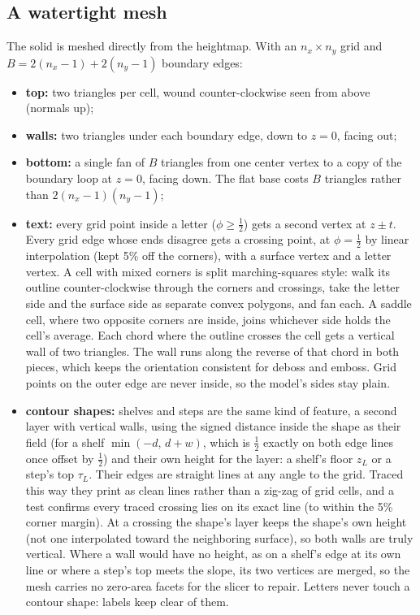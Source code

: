\documentclass[11pt,letterpaper]{article}
\begin{document}
\subsection{A watertight mesh}
\label{sec:mesh}

The solid is meshed directly from the heightmap. With an $n_x \times n_y$ grid and $B = 2(n_x - 1) + 2(n_y - 1)$ boundary edges:
\begin{itemize}
\setlength\itemsep{1pt}
\item \textbf{top:} two triangles per cell, wound counter-clockwise seen from above (normals up);
\item \textbf{walls:} two triangles under each boundary edge, down to $z = 0$, facing out;
\item \textbf{bottom:} a single fan of $B$ triangles from one center vertex to a copy of the boundary loop at $z = 0$, facing down. The flat base costs $B$ triangles rather than $2(n_x - 1)(n_y - 1)$;
\item \textbf{text:} every grid point inside a letter ($\phi \ge \tfrac12$) gets a second vertex at $z \pm t$. Every grid edge whose ends disagree gets a crossing point, at $\phi = \tfrac12$ by linear interpolation (kept 5\% off the corners), with a surface vertex and a letter vertex. A cell with mixed corners is split marching-squares style: walk its outline counter-clockwise through the corners and crossings, take the letter side and the surface side as separate convex polygons, and fan each. A saddle cell, where two opposite corners are inside, joins whichever side holds the cell's average. Each chord where the outline crosses the cell gets a vertical wall of two triangles. The wall runs along the reverse of that chord in both pieces, which keeps the orientation consistent for deboss and emboss. Grid points on the outer edge are never inside, so the model's sides stay plain.
\item \textbf{contour shapes:} shelves and steps are the same kind of feature, a second layer with vertical walls, using the signed distance inside the shape as their field (for a shelf $\min(-d,\, d + w)$, which is $\tfrac12$ exactly on both edge lines once offset by $\tfrac12$) and their own height for the layer: a shelf's floor $z_L$ or a step's top $\tau_L$. Their edges are straight lines at any angle to the grid. Traced this way they print as clean lines rather than a zig-zag of grid cells, and a test confirms every traced crossing lies on its exact line (to within the 5\% corner margin). At a crossing the shape's layer keeps the shape's own height (not one interpolated toward the neighboring surface), so both walls are truly vertical. Where a wall would have no height, as on a shelf's edge at its own line or where a step's top meets the slope, its two vertices are merged, so the mesh carries no zero-area facets for the slicer to repair. Letters never touch a contour shape: labels keep clear of them.
\end{itemize}
\end{document}
